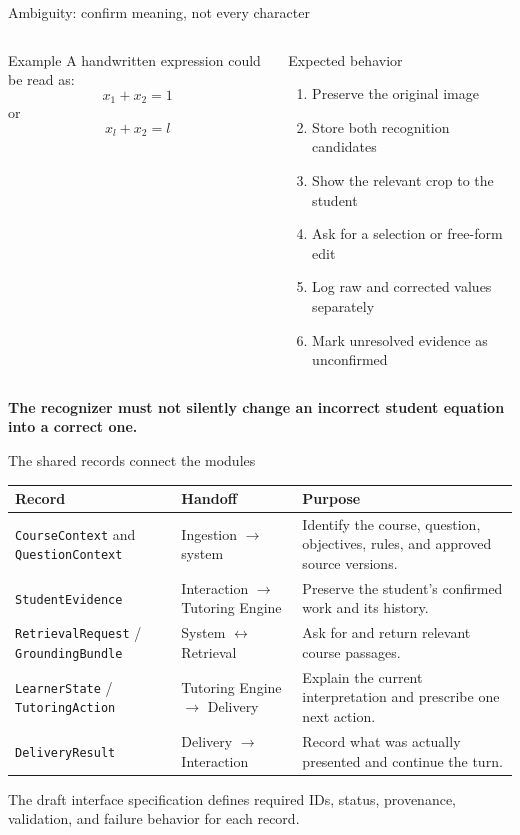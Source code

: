 \documentclass[aspectratio=169,10pt]{beamer}
\begin{document}
\begin{frame}{Ambiguity: confirm meaning, not every character}
\begin{columns}[T,onlytextwidth]
\begin{block}{Example}
A handwritten expression could be read as:
\[
  x_1+x_2=1
\]
or
\[
  x_l+x_2=l
\]
\end{block}
\begin{block}{Expected behavior}
\begin{enumerate}
\item Preserve the original image
\item Store both recognition candidates
\item Show the relevant crop to the student
\item Ask for a selection or free-form edit
\item Log raw and corrected values separately
\item Mark unresolved evidence as unconfirmed
\end{enumerate}
\end{block}
\end{columns}
\vspace{.45em}
\centering
\alert{\textbf{The recognizer must not silently change an incorrect student equation into a correct one.}}
\end{frame}

\begin{frame}{The shared records connect the modules}
\small
\begin{tabularx}{\textwidth}{@{}>{\raggedright\arraybackslash}p{}>{\raggedright\arraybackslash}p{}>{\raggedright\arraybackslash}X@{}}
\toprule
\textbf{Record} & \textbf{Handoff} & \textbf{Purpose} \\
\midrule
\texttt{CourseContext} and \texttt{QuestionContext} & Ingestion $\rightarrow$ system & Identify the course, question, objectives, rules, and approved source versions. \\
\addlinespace
\texttt{StudentEvidence} & Interaction $\rightarrow$ Tutoring Engine & Preserve the student's confirmed work and its history. \\
\addlinespace
\texttt{RetrievalRequest} / \texttt{GroundingBundle} & System $\leftrightarrow$ Retrieval & Ask for and return relevant course passages. \\
\addlinespace
\texttt{LearnerState} / \texttt{TutoringAction} & Tutoring Engine $\rightarrow$ Delivery & Explain the current interpretation and prescribe one next action. \\
\addlinespace
\texttt{DeliveryResult} & Delivery $\rightarrow$ Interaction & Record what was actually presented and continue the turn. \\
\bottomrule
\end{tabularx}
\vspace{.45em}
\centering
The draft interface specification defines required IDs, status, provenance, validation, and failure behavior for each record.
\end{frame}
\end{document}
